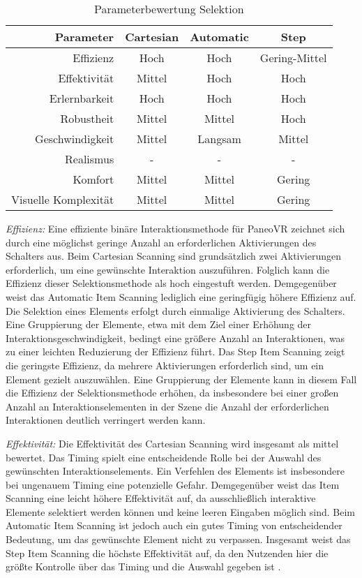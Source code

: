 \begin{table}[ht]
 \centering
 \begin{tabular}{r|c|c|c}
 Parameter & Cartesian & Automatic & Step \\
 \hline
 Effizienz & Hoch & Hoch & Gering-Mittel\\
 Effektivität & Mittel & Hoch & Hoch\\
 Erlernbarkeit & Hoch & Hoch & Hoch\\
 Robustheit & Mittel & Mittel & Hoch\\
 Geschwindigkeit & Mittel & Langsam & Mittel\\
 Realismus & - & - & - \\
 Komfort & Mittel & Mittel & Gering \\
 Visuelle Komplexität & Mittel & Mittel & Gering
 \end{tabular}
 \caption{Parameterbewertung Selektion}
 \label{tab:Selektion}
\end{table}

\textit{Effizienz:}
Eine effiziente binäre Interaktionsmethode für PaneoVR zeichnet sich durch eine möglichst geringe Anzahl an erforderlichen Aktivierungen des Schalters aus. Beim Cartesian Scanning sind grundsätzlich zwei Aktivierungen erforderlich, um eine gewünschte Interaktion auszuführen. Folglich kann die Effizienz dieser Selektionsmethode als hoch eingestuft werden. Demgegenüber weist das Automatic Item Scanning lediglich eine geringfügig höhere Effizienz auf. Die Selektion eines Elements erfolgt durch einmalige Aktivierung des Schalters. Eine Gruppierung der Elemente, etwa mit dem Ziel einer Erhöhung der Interaktionsgeschwindigkeit, bedingt eine größere Anzahl an Interaktionen, was zu einer leichten Reduzierung der Effizienz führt. Das Step Item Scanning zeigt die geringste Effizienz, da mehrere Aktivierungen erforderlich sind, um ein Element gezielt auszuwählen. Eine Gruppierung der Elemente kann in diesem Fall die Effizienz der Selektionsmethode erhöhen, da insbesondere bei einer großen Anzahl an Interaktionselementen in der Szene die Anzahl der erforderlichen Interaktionen deutlich verringert werden kann.

\textit{Effektivität:}
Die Effektivität des Cartesian Scanning wird insgesamt als mittel bewertet. Das Timing spielt eine entscheidende Rolle bei der Auswahl des gewünschten Interaktionselements. Ein Verfehlen des Elements ist insbesondere bei ungenauem Timing eine potenzielle Gefahr. Demgegenüber weist das Item Scanning eine leicht höhere Effektivität auf, da ausschließlich interaktive Elemente selektiert werden können und keine leeren Eingaben möglich sind. Beim Automatic Item Scanning ist jedoch auch ein gutes Timing von entscheidender Bedeutung, um das gewünschte Element nicht zu verpassen. Insgesamt weist das Step Item Scanning die höchste Effektivität auf, da den Nutzenden hier die größte Kontrolle über das Timing und die Auswahl gegeben ist \citep{COOK2015117}.

